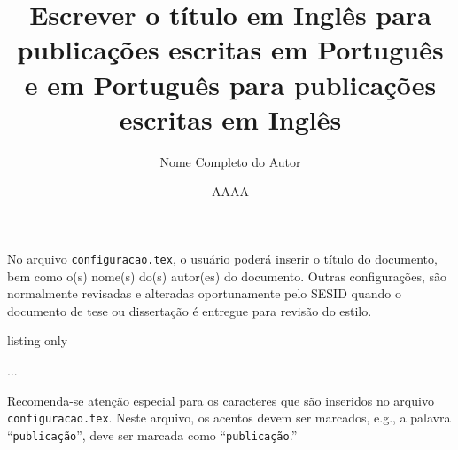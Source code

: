

No arquivo {\tt configuracao.tex}, o usuário poderá inserir o título do documento, bem como o(s) nome(s) do(s) autor(es) do documento. Outras configurações, são normalmente revisadas e alteradas oportunamente pelo SESID quando o documento de tese ou dissertação é entregue para revisão do estilo.

\begin{texexp}{listing only}
\title{Escrever o t\'{i}tulo em Ingl\^{e}s para publicaç\~{o}es
escritas em Portugu\^{e}s e em Portugu\^{e}s para publicaç\~{o}es
escritas em Ingl\^{e}s} 
\author{Nome Completo do Autor}
\date{AAAA}
...
\end{texexp}

\begin{marker}
Recomenda-se atenção especial para os caracteres que são inseridos no arquivo {\tt configuracao.tex}. Neste arquivo, os acentos devem ser marcados, e.g., a palavra ``{\tt publicação}'', deve ser marcada como ``\texttt{publicaç\~{a}o}.''
\end{marker}

